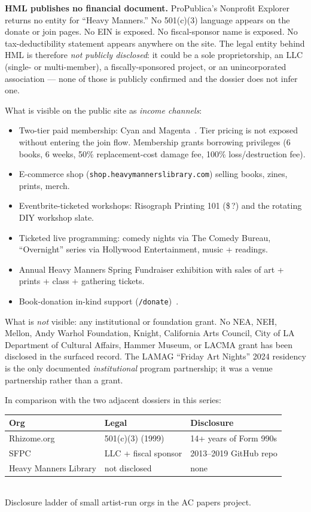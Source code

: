 \documentclass[10pt,letterpaper,twocolumn]{article}
\begin{document}
\textbf{HML publishes no financial document.} ProPublica's Nonprofit Explorer returns no entity for ``Heavy Manners.'' No 501(c)(3) language appears on the donate or join pages. No EIN is exposed. No fiscal-sponsor name is exposed. No tax-deductibility statement appears anywhere on the site. The legal entity behind HML is therefore \emph{not publicly disclosed}: it could be a sole proprietorship, an LLC (single- or multi-member), a fiscally-sponsored project, or an unincorporated association --- none of those is publicly confirmed and the dossier does not infer one.

What is visible on the public site as \emph{income channels}:

\begin{itemize}
\item Two-tier paid membership: Cyan and Magenta~\citep{hmljoin}. Tier pricing is not exposed without entering the join flow. Membership grants borrowing privileges (6 books, 6 weeks, 50\% replacement-cost damage fee, 100\% loss/destruction fee).
\item E-commerce shop (\texttt{shop.heavymannerslibrary.com}) selling books, zines, prints, merch.
\item Eventbrite-ticketed workshops: Risograph Printing 101 (\$\,?) and the rotating DIY workshop slate.
\item Ticketed live programming: comedy nights via The Comedy Bureau, ``Overnight'' series via Hollywood Entertainment, music + readings.
\item Annual Heavy Manners Spring Fundraiser exhibition with sales of art + prints + class + gathering tickets.
\item Book-donation in-kind support (\texttt{/donate})~\citep{hmldonate}.
\end{itemize}

What is \emph{not} visible: any institutional or foundation grant. No NEA, NEH, Mellon, Andy Warhol Foundation, Knight, California Arts Council, City of LA Department of Cultural Affairs, Hammer Museum, or LACMA grant has been disclosed in the surfaced record. The LAMAG ``Friday Art Nights'' 2024 residency is the only documented \emph{institutional} program partnership; it was a venue partnership rather than a grant.

In comparison with the two adjacent dossiers in this series:

\begin{table}[h]
\footnotesize
\centering
\setlength{\tabcolsep}{3pt}
\begin{tabularx}{\columnwidth}{Xll}
\toprule
\textbf{Org} & \textbf{Legal} & \textbf{Disclosure} \\
\midrule
Rhizome.org & 501(c)(3) (1999) & 14+ years of Form 990s \\
SFPC & LLC + fiscal sponsor & 2013--2019 GitHub repo \\
Heavy Manners Library & not disclosed & none \\
\bottomrule
\end{tabularx}
\\[0.3em]
\footnotesize Disclosure ladder of small artist-run orgs in the AC papers project.
\end{table}
\end{document}

